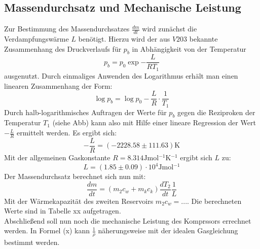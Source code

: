 \subsection{Massendurchsatz und Mechanische Leistung}
Zur Bestimmung des Massendurchsatzes $\frac{dm}{dt}$ wird zunächst die Verdampfungswärme $L$ benötigt. Hierzu wird der aus $V203$ bekannte Zusammenhang des Druckverlaufs für $p_b$ in Abhängigkeit von der Temperatur
\begin{equation}
  p_b = p_0 \exp{-\frac{L}{R T_1}}
\end{equation}
ausgenutzt. Durch einmaliges Anwenden des Logarithmus erhält man einen linearen Zusammenhang der Form:
\begin{equation}
  \log{p_b} = \log{p_0} -\frac{L}{R} \cdot \frac{1}{T_1}
\end{equation}
Durch halb-logarithmisches Auftragen der Werte für $p_b$ gegen die Reziproken der Temperatur $T_1$ (siehe Abb) kann also mit Hilfe einer lineare Regression der Wert $-\frac{L}{R}$ ermittelt werden.
Es ergibt sich:
\begin{equation}
  -\frac{L}{R} =  (-2228.58 \pm 111.63) \si{\kelvin}
\end{equation}
Mit der allgemeinen Gaskonstante $R = 8.314\si{\joule \mol^{-1} \kelvin^{-1}}$ ergibt sich $L$ zu:
\begin{equation}
  L = (1.85 \pm 0.09)\cdot 10^{4} \si{\joule \mol^{-1}}
\end{equation}
Der Massendurchsatz berechnet sich nun mit:
\begin{equation}
  \frac{dm}{dt} = (m_2 c_w + m_k c_k)\frac{dT_2}{dt} \frac{1}{L}
\end{equation}
Mit der Wärmekapazität des zweiten Reservoirs $m_2 c_w = ...$. Die berechneten Werte sind in Tabelle xx aufgetragen. \\
Abschließend soll nun noch die mechanische Leistung des Komprssors errechnet werden. In Formel (x) kann $\frac{1}{\rho}$
näherungsweise mit der idealen Gasgleichung bestimmt werden.






